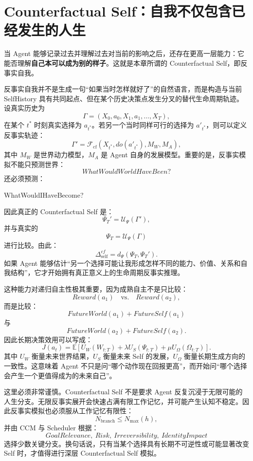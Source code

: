 \section{Counterfactual Self：自我不仅包含已经发生的人生}

当 Agent 能够记录过去并理解过去对当前的影响之后，还存在更高一层能力：它能否理解\textbf{自己本可以成为别的样子}。这就是本章所谓的 Counterfactual Self，即反事实自我。

反事实自我并不是生成一句“如果当时怎样就好了”的自然语言，而是构造与当前 SelfHistory 具有共同起点、但在某个历史决策点发生分叉的替代生命周期轨迹。设真实历史为
\[
\Gamma
=
(X_0,a_0,X_1,a_1,\ldots,X_T),
\]
在某个 $t^\ast$ 时刻真实选择为 $a_{t^\ast}$。若另一个当时同样可行的选择为 $a'_{t^\ast}$，则可以定义反事实轨迹：
\[
\Gamma'
=
\mathcal F_{\mathrm{cf}}
\left(
X_{t^\ast},
do(a'_{t^\ast}),
M_W,
M_A
\right),
\]
其中 $M_W$ 是世界动力模型，$M_A$ 是 Agent 自身的发展模型。重要的是，反事实模拟不能只预测世界：
\[
WhatWouldWorldHaveBeen?
\]
还必须预测：
\begin{statementbox}
WhatWouldIHaveBecome?
\end{statementbox}

因此真正的 Counterfactual Self 是：
\[
\Psi_T'
=
\mathcal U_{\Psi}
\left(
\Gamma'
\right),
\]
并与真实的
\[
\Psi_T
=
\mathcal U_{\Psi}
\left(
\Gamma
\right)
\]
进行比较。由此：
\[
\Delta_{\mathrm{self}}^{cf}
=
d_\Psi(\Psi_T,\Psi_T').
\]
如果 Agent 能够估计“另一个选择可能让我形成怎样不同的能力、价值、关系和自我结构”，它才开始拥有真正意义上的生命周期反事实推理。

这种能力对递归自主性极其重要，因为成熟自主不是只比较：
\[
Reward(a_1)
\quad\text{vs.}\quad
Reward(a_2),
\]
而是比较：
\[
\boxed{
FutureWorld(a_1)
+
FutureSelf(a_1)
}
\]
与
\[
\boxed{
FutureWorld(a_2)
+
FutureSelf(a_2).
}
\]
因此长期决策效用可以写成：
\[
J(a_t)
=
\mathbb E
\left[
U_W(W_{t:T})
+
\lambda U_S(\Psi_{t:T})
+
\mu U_\Omega(\Omega_{t:T})
\right].
\]
其中 $U_W$ 衡量未来世界结果，$U_S$ 衡量未来 Self 的发展，$U_\Omega$ 衡量长期生成方向的一致性。这意味着 Agent 不只是问“哪个动作现在回报更高”，而开始问“哪个选择会产生一个更值得成为的未来自己”。

这里必须非常谨慎。Counterfactual Self 不是要求 Agent 反复沉浸于无限可能的人生分支。无限反事实展开会快速占满有限工作记忆，并可能产生认知不稳定。因此反事实模拟也必须服从工作记忆有限性：
\[
N_{\mathrm{branch}}
\leq
N_{\max}(h),
\]
并由 CCM 与 Scheduler 根据：
\[
GoalRelevance,\ Risk,\ Irreversibility,\ IdentityImpact
\]
选择少数关键分支。换句话说，只有当某个选择具有长期不可逆性或可能显著改变 Self 时，才值得进行深层 Counterfactual Self 模拟。

